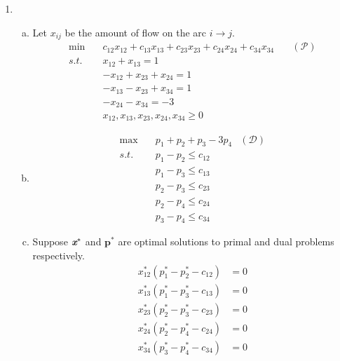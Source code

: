 \begin{enumerate}
\begin{enumerate}[(a)]
\end{enumerate}

\newpage
\item 
{}
\begin{enumerate}[(a)]
	\item Let $x_{ij}$ be the amount of flow on the arc $i\rightarrow j$.
	\[
	\begin{aligned}
	\min \quad & c_{12}x_{12}+c_{13}x_{13}+c_{23}x_{23}+c_{24}x_{24}+c_{34}x_{34} &\quad(\mathcal{P})\\
	s.t. \quad & x_{12} + x_{13}  = 1\\
	&-x_{12} + x_{23} + x_{24} = 1\\
	&-x_{13}-x_{23}+ x_{34} =1\\
	&-x_{24} - x_{34}  =-3\\
	&x_{12}, x_{13}, x_{23}, x_{24}, x_{34} \ge 0
	\end{aligned}
	\]
	
	\item \[
	\begin{aligned}
	\max \quad &p_1+p_2+p_3-3p_4 &(\mathcal{D})\\
	s.t.\quad & p_1 - p_2 \le c_{12}\\
	&p_1-p_3 \le c_{13}\\
	&p_2-p_3 \le c_{23}\\
	&p_2-p_4\le c_{24}\\
	&p_3-p_4\le c_{34}
	\end{aligned}
	\]
	
	\item Suppose $\textit{\textbf{x}}^*$ and $\bm p^*$ are optimal solutions to primal and dual problems respectively.
	\[
	\begin{aligned}
	x_{12}^*(p_1^* - p_2^* - c_{12})&=0\\
	x_{13}^*(p_1^*-p_3^*- c_{13})&=0\\
	x_{23}^*(p_2^*-p_3^* - c_{23})&=0\\
	x_{24}^*(p_2^*-p_4^*- c_{24})&=0\\
	x_{34}^*(p_3^*-p_4^*-c_{34})&=0
	\end{aligned}
	\]
	

\end{enumerate}
\end{enumerate}
